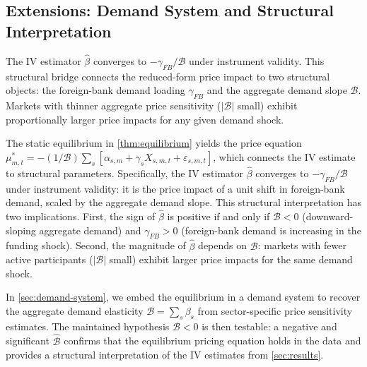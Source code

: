 \subsection{Extensions: Demand System and Structural Interpretation}
\label{subsec:theory-extensions}
\label{subsec:demand-system}

\begin{remark}\label{rem:price-impact}
The IV estimator $\hat\beta$ converges to $-\gamma_{FB}/\mathcal{B}$ under
instrument validity. This structural bridge connects the reduced-form price
impact to two structural objects: the foreign-bank demand loading $\gamma_{FB}$
and the aggregate demand slope $\mathcal{B}$. Markets with thinner aggregate
price sensitivity ($|\mathcal{B}|$ small) exhibit proportionally larger price
impacts for any given demand shock.
\end{remark}

The static equilibrium in \cref{thm:equilibrium} yields the price equation
$\mu_{m,t}^* = -(1/\mathcal{B}) \sum_s [\alpha_{s,m} + \gamma_s X_{s,m,t} +
\varepsilon_{s,m,t}]$, which connects the IV estimate to structural parameters.
Specifically, the IV estimator $\hat\beta$ converges to $-\gamma_{FB}/\mathcal{B}$
under instrument validity: it is the price impact of a unit shift in foreign-bank
demand, scaled by the aggregate demand slope. This structural interpretation has
two implications. First, the sign of $\hat\beta$ is positive if and only if
$\mathcal{B} < 0$ (downward-sloping aggregate demand) and $\gamma_{FB} > 0$
(foreign-bank demand is increasing in the funding shock). Second, the magnitude
of $\hat\beta$ depends on $\mathcal{B}$: markets with fewer active participants
($|\mathcal{B}|$ small) exhibit larger price impacts for the same demand shock.

In \cref{sec:demand-system}, we embed the equilibrium in a demand system to
recover the aggregate demand elasticity $\mathcal{B} = \sum_s \beta_s$ from
sector-specific price sensitivity estimates. The maintained hypothesis
$\mathcal{B} < 0$ is then testable: a negative and significant
$\hat{\mathcal{B}}$ confirms that the equilibrium pricing equation holds in the
data and provides a structural interpretation of the IV estimates from
\cref{sec:results}.

